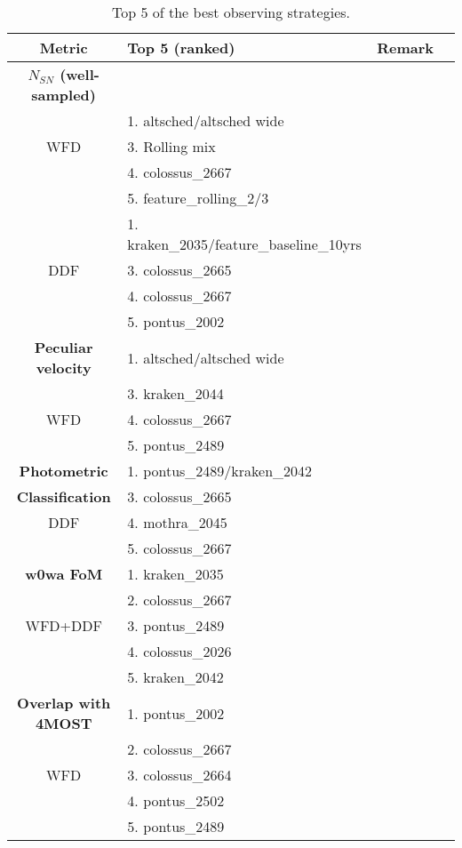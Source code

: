 \begin{table}[!htbp]
  \begin{center}
    \caption{Top 5 of the best observing strategies.}\label{tab:summary_top}
\begin{tabular}{clcc}
  \hline
  \hline
Metric  & Top 5 (ranked) & Remark \\
\hline
\hline
{\bf $N_{SN}$ (well-sampled)}  &  & \\
   & 1. altsched/altsched wide & \\
WFD             & 3. Rolling mix & \\
             & 4. colossus\_2667 &  \\
& 5. feature\_rolling\_2/3 & \\
   & 1. kraken\_2035/feature\_baseline\_10yrs &  \\
DDF & 3. colossus\_2665 &  \\
& 4. colossus\_2667 & \\
& 5. pontus\_2002 &  \\
\hline
{\bf Peculiar velocity} & 1. altsched/altsched wide &  \\
                & 3. kraken\_2044 &  \\
      WFD                          & 4. colossus\_2667 & \\
                               & 5. pontus\_2489 & \\
      \hline
{\bf Photometric}   & 1. pontus\_2489/kraken\_2042 &  \\
{\bf Classification}  & 3. colossus\_2665 &  \\
      DDF             & 4. mothra\_2045 &  \\
                               & 5. colossus\_2667 &  \\
      \hline
          {\bf w0wa FoM}  & 1. kraken\_2035 &  \\
& 2. colossus\_2667 & \\
      WFD+DDF             & 3. pontus\_2489 &  \\
      & 4. colossus\_2026 &  \\
      & 5. kraken\_2042 &  \\
      \hline
 {\bf Overlap with 4MOST}  & 1. pontus\_2002 &  \\
     & 2. colossus\_2667 & \\
   WFD                   & 3. colossus\_2664 &  \\
      & 4. pontus\_2502 &  \\
      & 5. pontus\_2489 &  \\
     \hline
\end{tabular}
\end{center}
\end{table}


